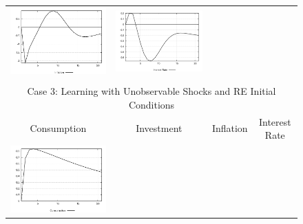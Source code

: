 \begin{figure}
\begin{tabular}{cccc}
\includegraphics[scale=0.22]{results_reallinit/Inflation_prefshock_irf.png} & 
\includegraphics[scale=0.22]{results_reallinit/Interest_Rate_prefshock_irf.png} \\ \\ 
\multicolumn{4}{c}{Case 3: Learning with Unobservable Shocks and RE Initial Conditions}\\
Consumption & Investment & Inflation & Interest Rate \\ 
\includegraphics[scale=0.22]{results_reinit/Consumption_prefshock_irf.png} & 

\end{tabular}
\end{figure}
